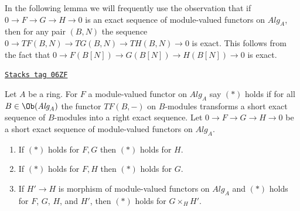 In the following lemma we will frequently use the observation that
if $0 \to F \to G \to H \to 0$ is an exact sequence of module-valued
functors on $\textit{Alg}_A$, then for any pair $(B, N)$ the
sequence $0 \to TF(B, N) \to TG(B, N) \to TH(B, N) \to 0$ is exact.
This follows from the fact that $0 \to F(B[N]) \to G(B[N]) \to H(B[N]) \to 0$
is exact.

\begin{lemma}
\label{adequate-lemma-exactness-permanence}
\href{https://stacks.math.columbia.edu/tag/06ZF}{\texttt{Stacks tag 06ZF}}

Let $A$ be a ring. For $F$ a module-valued functor on $\textit{Alg}_A$
say $(*)$ holds if for all $B \in \Ob(\textit{Alg}_A)$ the
functor $TF(B, -)$ on $B$-modules transforms a short exact sequence
of $B$-modules into a right exact sequence. Let
$0 \to F \to G \to H \to 0$ be a short exact sequence of
module-valued functors on $\textit{Alg}_A$.
\begin{enumerate}
\item If $(*)$ holds for $F, G$ then $(*)$ holds for $H$.
\item If $(*)$ holds for $F, H$ then $(*)$ holds for $G$.
\item If $H' \to H$ is morphism of module-valued functors on $\textit{Alg}_A$
and $(*)$ holds for $F$, $G$, $H$, and $H'$, then $(*)$ holds for
$G \times_H H'$.
\end{enumerate}
\end{lemma}

